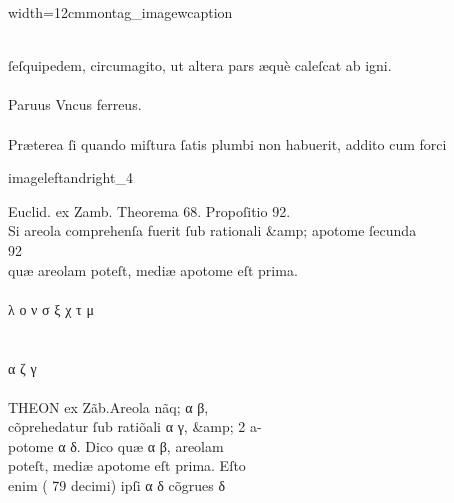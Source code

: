 \vspace{2mm}
\begin{sampleImageSmall}{width=12cm}{montag_imagewcaption}
\begin{typeLatin}
 \someText \\
ſeſquipedem, circumagito, ut altera pars æquè caleſcat ab igni.\\
 \\
Paruus Vncus ferreus.\\
 \\
Præterea ſi quando miſtura ſatis plumbi non habuerit, addito cum forci  \\
\someText {}
\end{typeLatin}
\end{sampleImageSmall}

\begin{sampleImage}{imageleftandright_4}
\begin{typeLatin}
Euclid. ex Zamb. T\lwr{}heorema 68. P\lwr{}ropoſitio 92. \\
Si areola comprehenſa fuerit ſub rationali &amp; apotome ſecunda \\
92\\
quæ areolam poteſt, mediæ apotome eſt prima. \\
 \\
λ  ο  ν  σ ξ χ  τ μ \\
 \\
\\
α   ζ  γ     \\
 \\
THEON ex Zãb.\lwr {}Areola nãq; α β, \\
cõpreh\bs\tld{}edatur ſub ratiõali α γ, \&amp; 2 a- \\
potome α δ. Dico  quæ α β, areolam\\
poteſt, mediæ apotome eſt prima. Eſto\\
enim ( 79 decimi) ipſi α δ cõgru\bs\tld{}es δ\\
\someText {}
\end{typeLatin}
\end{sampleImage}

